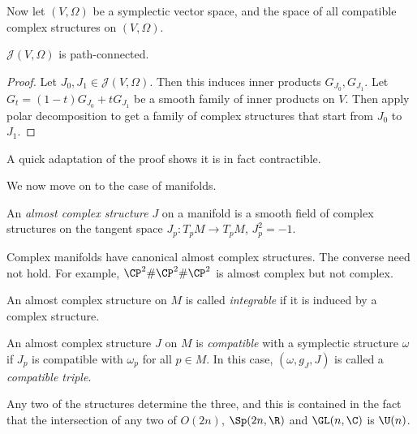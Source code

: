 \documentclass[a4paper]{article}
\begin{document}
Now let $(V, \Omega)$ be a symplectic vector space, and  the space of all compatible complex structures on $(V, \Omega)$.

\begin{prop}
  $\mathcal{J}(V, \Omega)$ is path-connected.
\end{prop}

\begin{proof}
  Let $J_0, J_1 \in \mathcal{J}(V, \Omega)$. Then this induces inner products $G_{J_0}, G_{J_1}$. Let $G_t = (1 - t) G_{J_0} + t G_{J_1}$ be a smooth family of inner products on $V$. Then apply polar decomposition to get a family of complex structures that start from $J_0$ to $J_1$.
\end{proof}
A quick adaptation of the proof shows it is in fact contractible.

We now move on to the case of manifolds.

\begin{defi}
  An \emph{almost complex structure} $J$ on a manifold is a smooth field of complex structures on the tangent space $J_p: T_p M \to T_p M$, $J_p^2 = -1$.
\end{defi}

\begin{eg}
  Complex manifolds have canonical almost complex structures. The converse need not hold. For example, $\CP^2 \# \CP^2 \# \CP^2$ is almost complex but not complex.
\end{eg}

\begin{defi}
  An almost complex structure on $M$ is called \emph{integrable} if it is induced by a complex structure.
\end{defi}

\begin{defi}
  An almost complex structure $J$ on $M$ is \emph{compatible} with a symplectic structure $\omega$ if $J_p$ is compatible with $\omega_p$ for all $p \in M$. In this case, $(\omega, g_J, J)$ is called a \emph{compatible triple}.
\end{defi}
Any two of the structures determine the three, and this is contained in the fact that the intersection of any two of $O(2n)$, $\Sp(2n, \R)$ and $\GL(n, \C)$ is $\U(n)$.
\end{document}
